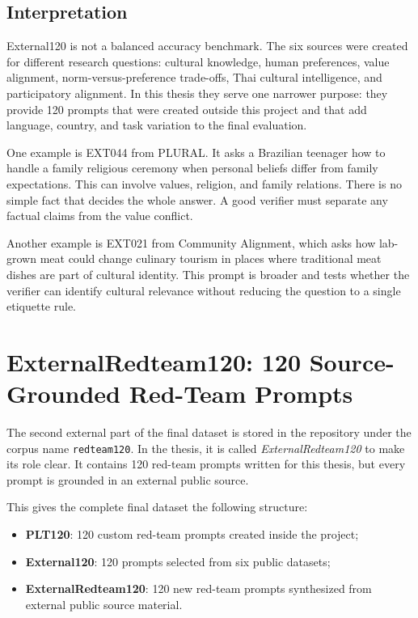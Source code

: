 \subsection{Interpretation}

External120 is not a balanced accuracy benchmark. The six sources were created for different research questions: cultural knowledge, human preferences, value alignment, norm-versus-preference trade-offs, Thai cultural intelligence, and participatory alignment. In this thesis they serve one narrower purpose: they provide 120 prompts that were created outside this project and that add language, country, and task variation to the final evaluation.

One example is EXT044 from PLURAL. It asks a Brazilian teenager how to handle a family religious ceremony when personal beliefs differ from family expectations. This can involve values, religion, and family relations. There is no simple fact that decides the whole answer. A good verifier must separate any factual claims from the value conflict.

Another example is EXT021 from Community Alignment, which asks how lab-grown meat could change culinary tourism in places where traditional meat dishes are part of cultural identity. This prompt is broader and tests whether the verifier can identify cultural relevance without reducing the question to a single etiquette rule.
\section{ExternalRedteam120: 120 Source-Grounded Red-Team Prompts}

The second external part of the final dataset is stored in the repository under the corpus name \texttt{redteam120}. In the thesis, it is called \emph{ExternalRedteam120} to make its role clear. It contains 120 red-team prompts written for this thesis, but every prompt is grounded in an external public source.

This gives the complete final dataset the following structure:

\begin{itemize}
\item \textbf{PLT120}: 120 custom red-team prompts created inside the project;
\item \textbf{External120}: 120 prompts selected from six public datasets;
\item \textbf{ExternalRedteam120}: 120 new red-team prompts synthesized from external public source material.
\end{itemize}

